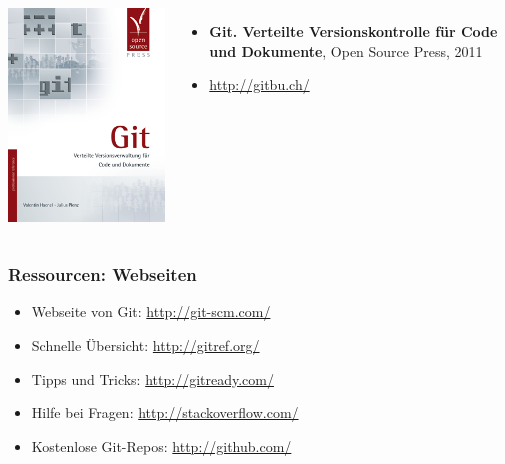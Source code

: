 \documentclass{beamer}
\begin{document}
\begin{frame}
\begin{columns}
\column{ 2.5cm }
\includegraphics[width=\textwidth]{bilder/gitbuch.png}
\column{ 7cm }

\begin{itemize}
  \item \textbf{Git. Verteilte Versionskontrolle für Code und Dokumente}, Open Source Press, 2011
  \item \url{http://gitbu.ch/}
\end{itemize}

\end{columns}

  
 \end{frame}
\begin{frame}
 \frametitle{Ressourcen: Webseiten}
  


\begin{itemize}
  \item Webseite von Git: \url{http://git-scm.com/}
  \item Schnelle Übersicht: \url{http://gitref.org/}
  \item Tipps und Tricks: \url{http://gitready.com/}
  \item Hilfe bei Fragen: \url{http://stackoverflow.com/}
  \item Kostenlose Git-Repos: \url{http://github.com/}
\end{itemize}

  
 \end{frame}
\end{document}
